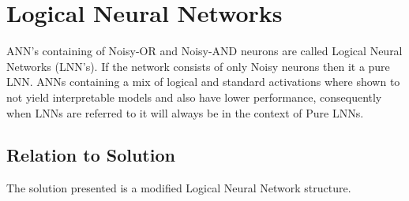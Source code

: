 \section{Logical Neural Networks}
ANN's containing of Noisy-OR and Noisy-AND neurons are called Logical Neural Networks \cite{LearningLogicalActivations} (LNN's). If the network consists of only Noisy neurons then it a pure LNN. ANNs containing a mix of logical and standard activations where shown to not yield interpretable models and also have lower performance, consequently when LNNs are referred to it will always be in the context of Pure LNNs.

\subsection{Relation to Solution}
The solution presented is a modified Logical Neural Network structure.
